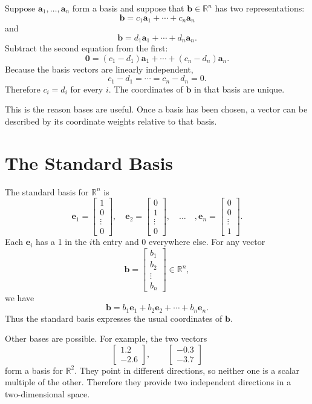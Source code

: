Suppose \(\mathbf{a}_1,\ldots,\mathbf{a}_n\) form a basis and suppose that \(\mathbf{b}\in\mathbb{R}^n\) has two representations:
\[
    \mathbf{b}=c_1\mathbf{a}_1+\cdots+c_n\mathbf{a}_n
\]
and
\[
    \mathbf{b}=d_1\mathbf{a}_1+\cdots+d_n\mathbf{a}_n.
\]
Subtract the second equation from the first:
\[
    \mathbf{0}
    =
    (c_1-d_1)\mathbf{a}_1+\cdots+(c_n-d_n)\mathbf{a}_n.
\]
Because the basis vectors are linearly independent,
\[
    c_1-d_1=\cdots=c_n-d_n=0.
\]
Therefore \(c_i=d_i\) for every \(i\). The coordinates of \(\mathbf{b}\) in that basis are unique.

This is the reason bases are useful. Once a basis has been chosen, a vector can be described by its coordinate weights relative to that basis.

\section{The Standard Basis}
\label{mf:standard-basis}

The standard basis for \(\mathbb{R}^n\) is
\[
    \mathbf{e}_1=\begin{bmatrix}1\\0\\\vdots\\0\end{bmatrix},
    \quad
    \mathbf{e}_2=\begin{bmatrix}0\\1\\\vdots\\0\end{bmatrix},
    \quad \ldots \quad,
    \mathbf{e}_n=\begin{bmatrix}0\\0\\\vdots\\1\end{bmatrix}.
\]
Each \(\mathbf{e}_i\) has a 1 in the \(i\)th entry and 0 everywhere else. For any vector
\[
    \mathbf{b}=\begin{bmatrix}b_1\\b_2\\\vdots\\b_n\end{bmatrix}\in\mathbb{R}^n,
\]
we have
\[
    \mathbf{b}=b_1\mathbf{e}_1+b_2\mathbf{e}_2+\cdots+b_n\mathbf{e}_n.
\]
Thus the standard basis expresses the usual coordinates of \(\mathbf{b}\).

Other bases are possible. For example, the two vectors
\[
    \begin{bmatrix}1.2\\-2.6\end{bmatrix},
    \qquad
    \begin{bmatrix}-0.3\\-3.7\end{bmatrix}
\]
form a basis for \(\mathbb{R}^2\). They point in different directions, so neither one is a scalar multiple of the other. Therefore they provide two independent directions in a two-dimensional space.


